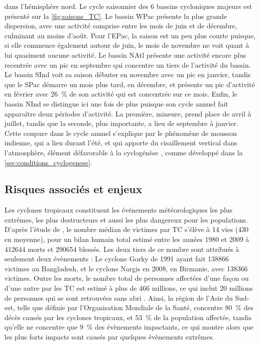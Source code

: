 \documentclass[../main.tex]{subfiles}
\begin{document}
dans l'hémisphère nord. Le cycle saisonnier des \num{6} bassins cycloniques majeurs est présenté sur la \cref{fig:saisons_TC}. Le bassin WPac présente la plus
grande dispersion, avec une activité comprise entre les mois de juin et de décembre, culminant au moins d'août. Pour l'EPac, la saison est un peu plus courte
puisque, si elle commence également autour de juin, le mois de novembre ne voit quant à lui quasiment aucune activité. Le bassin NAtl présente une activité
encore plus recentrée avec un pic en septembre qui concentre un tiers de l'activité du bassin. Le bassin SInd voit sa saison débuter en novembre avec un pic en
janvier, tandis que le SPac démarre un mois plus tard, en décembre, et présente un pic d'activité en février avec \SI{26}{\percent} de son activité qui est
concentrée sur ce mois. Enfin, le bassin NInd se distingue ici une fois de plus puisque son cycle annuel fait apparaître deux périodes d'activité. La première,
mineure, prend place de avril à juillet, tandis que la seconde, plus importante, a lieu de septembre à janvier. Cette coupure dans le cycle annuel s'explique
par le phénomène de mousson indienne, qui a lieu durant l'été, et qui apporte du cisaillement vertical dans l'atmosphère, élément défavorable à la cyclogénèse
\parencite{gray_global_1968}, comme développé dans la \cref{sec:conditions_cyclogenese}.

\subsection{Risques associés et enjeux}\label{sec:risques}

Les cyclones tropicaux constituent les événements météorologiques les plus extrêmes, les plus destructeurs et aussi les plus dangereux pour les populations.
D'après l'étude de \textcite{doocy_human_2013}, le nombre médian de victimes par TC s'élève à \num{14} vies (\num{430} en moyenne), pour un bilan humain total
estimé entre les années 1980 et 2009 à \num{412644} morts et \num{290654} blessés. Les deux tiers de ce nombre sont attribués à seulement deux évènements : Le
cyclone Gorky de 1991 ayant fait \num{138866} victimes au Bangladesh, et le cyclone Nargis en 2008, en Birmanie, avec \num{138366} victimes. Outre les morts, le
nombre total de personnes affectées d'une façon ou d'une autre par les TC est estimé à plus de \num{466} millions, ce qui inclut \num{20} millions de personnes
qui se sont retrouvées sans abri \parencite{doocy_human_2013}. Ainsi, la région de l'Asie du Sud-est, telle que définie par l'Organisation Mondiale de la Santé,
concentre \SI{80}{\percent} des décès causés par les cyclones tropicaux, et \SI{53}{\percent} de la population affectée, tandis qu'elle ne concentre que
\SI{9}{\percent} des évènements impactants, ce qui montre alors que les plus forts impacts sont causés par quelques évènements extrêmes.
\end{document}
